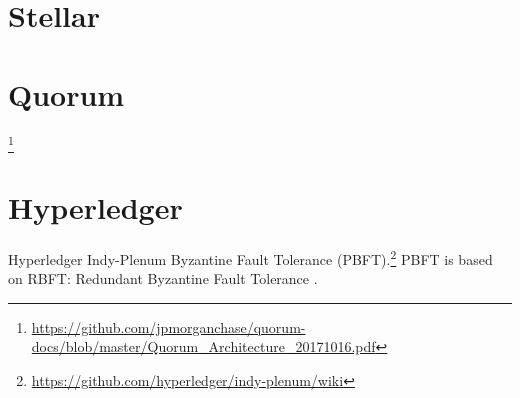 \section{Stellar}


\section{Quorum}

\footnote{\url{https://github.com/jpmorganchase/quorum-docs/blob/master/Quorum_Architecture_20171016.pdf}}



\section{Hyperledger}

\cite{AndroulakiEtAl2018}



Hyperledger Indy-Plenum Byzantine Fault Tolerance (PBFT).\footnote{\url{https://github.com/hyperledger/indy-plenum/wiki}} PBFT is based on RBFT: Redundant Byzantine Fault Tolerance
\cite{Aublinetal2013}.










